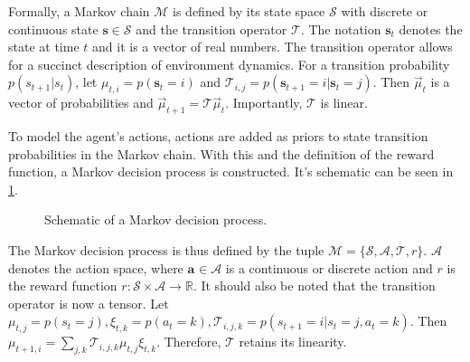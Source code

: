 Formally, a Markov chain $ \mathcal{M}  $ is defined by its state space
$ \mathcal{S}  $ with discrete or continuous state $ \bm{s} \in \mathcal{S}  $
and the transition operator $ \mathcal{T}  $.
The notation $ \bm{s}_{ t }  $ denotes the state at time $ t  $ and it is a vector of real numbers.
The transition operator allows for a succinct description of environment dynamics.
For a transition probability $ p(s_{ t+1 }|s_{ t })  $,
let $ \mu_{ t,i } = p (\bm{s}_{t} = i)  $ and
$ \mathcal{T}_{ i,j } = p (\bm{s}_{t+1} = i|\bm{s}_{t} = j )  $.
Then $\overrightarrow{\mu}_t$ is a vector of probabilities and 
$\overrightarrow{\mu}_{t+1} = \mathcal{T} \overrightarrow{\mu}_t$.
Importantly, $ \mathcal{T}  $ is linear.

To model the agent's actions, 
actions are added as priors to state transition probabilities
in the Markov chain. 
With this and the definition of the reward function,
a Markov decision process is constructed.
It's schematic can be seen in \ref{fig:mdp}.
\begin{figure}[htpb]
\begin{center}
\end{center}
\caption{Schematic of a Markov decision process.}
\label{fig:mdp}
\end{figure}

The Markov decision process is thus defined by the tuple
$ \mathcal{M} = \{\mathcal{S}, \mathcal{A}, \mathcal{T}, r\}  $.
$ \mathcal{A}  $ denotes the action space, where
$ \bm{a}_{} \in \mathcal{A}  $ is a continuous or discrete action and
$ r  $ is the reward function $r : \mathcal{S} \times \mathcal{A} \to \mathbb{R}$.
It should also be noted that the transition operator is now a tensor.
Let $\mu_{t,j} = p(s_t = j), \xi_{t,k} = p(a_t = k), \mathcal{T}_{i,j,k} = p(s_{t+1} = i | s_t =j, a_t =k) $.
Then $\mu_{t+1,i} = \sum_{j,k}^{} \mathcal{T}_{i,j,k} \mu_{t,j} \xi_{t,k}$.
Therefore, $ \mathcal{T}  $ retains its linearity.


